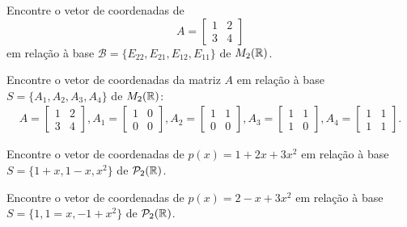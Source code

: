 \documentclass[12pt]{exam}
\begin{document}
    \begin{exercicio}
        Encontre o vetor de coordenadas de
        \[
            A = \begin{bmatrix}
                1 & 2\\
                3 & 4
            \end{bmatrix}
        \]
        em relação à base $\mathcal{B} = \{E_{22}, E_{21}, E_{12}, E_{11}\}$ de $M_2(\mathbb{R})$.
    \end{exercicio}

    \begin{exercicio}
        Encontre o vetor de coordenadas da matriz $A$ em relação à base $S = \{A_1, A_2, A_3, A_4\}$ de $M_2(\mathbb{R})$:
        \begin{align*}
            A = \begin{bmatrix}
                1 & 2\\
                3 & 4
            \end{bmatrix},
            A_1 = \begin{bmatrix}
                1 & 0\\
                0 & 0
            \end{bmatrix},
            A_2 = \begin{bmatrix}
                1 & 1\\
                0 & 0
            \end{bmatrix},
            A_3 = \begin{bmatrix}
                1 & 1\\
                1 & 0
            \end{bmatrix},
            A_4 = \begin{bmatrix}
                1 & 1\\
                1 & 1
            \end{bmatrix}.
        \end{align*}
    \end{exercicio}

    \begin{exercicio}
        Encontre o vetor de coordenadas de $p(x) = 1 + 2x + 3x^2$ em relação à base $S = \{1 + x, 1 - x, x^2\}$ de $\mathcal{P}_2(\mathbb{R})$.
    \end{exercicio}

    \begin{exercicio}
        Encontre o vetor de coordenadas de $p(x) = 2 - x + 3x^2$ em relação à base $S = \{1, 1 = x, -1 + x^2\}$ de $\mathcal{P}_2(\mathbb{R})$.
    \end{exercicio}
\end{document}
